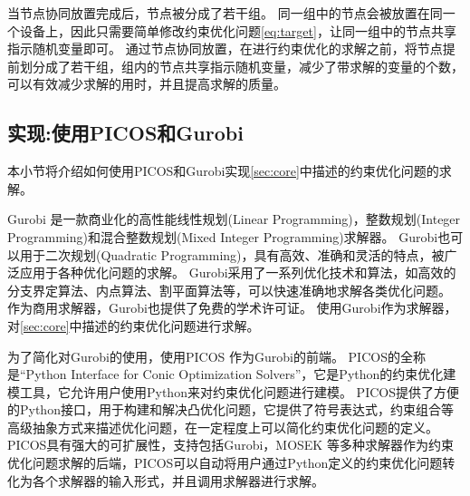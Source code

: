 当节点协同放置完成后，节点被分成了若干组。
同一组中的节点会被放置在同一个设备上，因此只需要简单修改约束优化问题\ref{eq:target}，让同一组中的节点共享指示随机变量即可。
通过节点协同放置，\sys{}在进行约束优化的求解之前，将节点提前划分成了若干组，组内的节点共享指示随机变量，减少了带求解的变量的个数，可以有效减少求解的用时，并且提高求解的质量。

\subsection{实现:使用PICOS和Gurobi}
\label{sec:picos-implement}
本小节将介绍如何使用PICOS和Gurobi实现\ref{sec:core}中描述的约束优化问题的求解。

Gurobi 是一款商业化的高性能线性规划(Linear Programming)，整数规划(Integer Programming)和混合整数规划(Mixed Integer Programming)求解器。
Gurobi也可以用于二次规划(Quadratic Programming)，具有高效、准确和灵活的特点，被广泛应用于各种优化问题的求解。
Gurobi采用了一系列优化技术和算法，如高效的分支界定算法、内点算法、割平面算法等，可以快速准确地求解各类优化问题。
作为商用求解器，Gurobi也提供了免费的学术许可证。
\sys{}使用Gurobi作为求解器，对\ref{sec:core}中描述的约束优化问题进行求解。

为了简化对Gurobi的使用，\sys{}使用PICOS 作为Gurobi的前端。
PICOS的全称是“Python Interface for Conic Optimization Solvers”，它是Python的约束优化建模工具，它允许用户使用Python来对约束优化问题进行建模。
PICOS提供了方便的Python接口，用于构建和解决凸优化问题，它提供了符号表达式，约束组合等高级抽象方式来描述优化问题，在一定程度上可以简化约束优化问题的定义。
PICOS具有强大的可扩展性，支持包括Gurobi，MOSEK 等多种求解器作为约束优化问题求解的后端，PICOS可以自动将用户通过Python定义的约束优化问题转化为各个求解器的输入形式，并且调用求解器进行求解。


